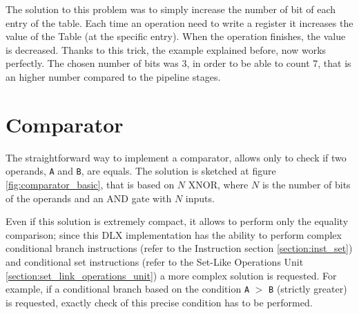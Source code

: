 The solution to this problem was to simply increase the number of bit of each entry of the table. Each time an operation need to write a register it increases the value of the Table (at the specific entry). When the operation finishes, the value is decreased. Thanks to this trick, the example explained before, now works perfectly. 
The chosen number of bits was 3, in order to be able to count 7, that is an higher number compared to the pipeline stages. 

\section{Comparator}
\label{sec:comparator}
The straightforward way to implement a comparator, allows only to check if two operands, \texttt{A} and \texttt{B}, are equals. The solution is sketched at figure \ref{fig:comparator_basic}, that is based on $N$ XNOR, where $N$ is the number of bits of the operands and an AND gate with $N$ inputs.

Even if this solution is extremely compact, it allows to perform only the equality comparison; since this DLX implementation has the ability to perform complex conditional branch instructions (refer to the Instruction section \ref{section:inst_set}) and conditional set instructions (refer to the Set-Like Operations Unit \ref{section:set_link_operations_unit}) a more complex solution is requested. For example, if a conditional branch based on the condition \texttt{A} $>$ \texttt{B} (strictly greater) is requested, exactly check of this precise condition has to be performed.

